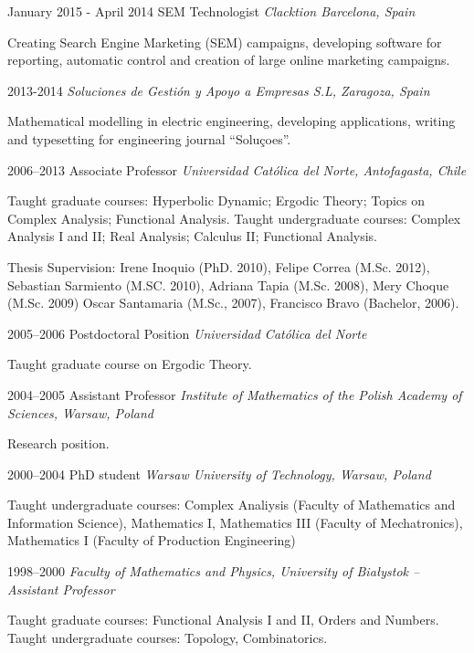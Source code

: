\documentclass{article}
\begin{document}
\begin{CV}
\item[January 2015 - April 2014] {SEM Technologist \it Clacktion
    Barcelona, Spain}

  Creating Search Engine Marketing (SEM) campaigns, developing
  software for reporting, automatic control and creation of large
  online marketing campaigns.
  

\item[2013-2014] {\it Soluciones de Gestión y Apoyo a Empresas S.L,
    Zaragoza, Spain}

  Mathematical modelling in electric engineering, developing
  applications,  writing and typesetting for engineering journal
  ``Soluçoes''.


\item[2006--2013] {Associate Professor \it Universidad Cat\'olica del Norte,
    Antofagasta, Chile}
  
  Taught graduate courses: Hyperbolic Dynamic; Ergodic Theory; Topics
  on Complex Analysis; Functional Analysis.  Taught undergraduate
  courses: Complex Analysis I and II; Real Analysis; Calculus II;
  Functional Analysis.
  
  Thesis Supervision: Irene Inoquio (PhD. 2010), Felipe Correa
  (M.Sc. 2012), Sebastian Sarmiento (M.SC. 2010), Adriana Tapia
  (M.Sc. 2008), Mery Choque (M.Sc. 2009) Oscar Santamaria (M.Sc.,
  2007), Francisco Bravo (Bachelor, 2006).
\item[2005--2006] {Postdoctoral Position \it Universidad Cat\'olica del Norte}

  Taught graduate course on Ergodic Theory.
\item[2004--2005] {Assistant Professor \em Institute of Mathematics of the Polish Academy of
    Sciences, Warsaw, Poland}

  Research position.
\item[2000--2004] {PhD student \it Warsaw University of Technology, Warsaw, Poland}

  Taught undergraduate courses: Complex Analiysis (Faculty of
  Mathematics and Information Science), Mathematics I, Mathematics III
  (Faculty of Mechatronics), Mathematics I (Faculty of Production Engineering)
\item[1998--2000] {\em Faculty of Mathematics and Physics, University
    of Bia{\l}ystok -- Assistant Professor}

  Taught graduate courses: Functional Analysis I and II, Orders and
  Numbers.  Taught undergraduate courses: Topology, Combinatorics.
\end{CV}
\end{document}
